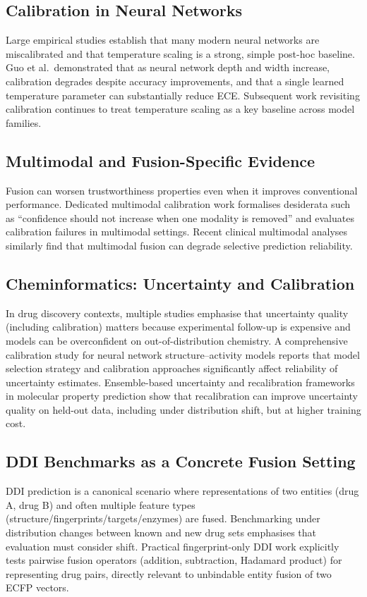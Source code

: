 \documentclass[11pt,a4paper,twocolumn]{article}
\begin{document}
\subsection{Calibration in Neural Networks}
Large empirical studies establish that many modern neural networks are
miscalibrated and that temperature scaling is a strong, simple post-hoc
baseline.
Guo et al.\ demonstrated that as neural network depth and width increase,
calibration degrades despite accuracy improvements, and that a single
learned temperature parameter can substantially reduce ECE.
Subsequent work revisiting calibration continues to treat temperature
scaling as a key baseline across model families.

\subsection{Multimodal and Fusion-Specific Evidence}
Fusion can worsen trustworthiness properties even when it improves
conventional performance.
Dedicated multimodal calibration work formalises desiderata such as
``confidence should not increase when one modality is removed'' and
evaluates calibration failures in multimodal settings.
Recent clinical multimodal analyses similarly find that multimodal fusion
can degrade selective prediction reliability.

\subsection{Cheminformatics: Uncertainty and Calibration}
In drug discovery contexts, multiple studies emphasise that uncertainty
quality (including calibration) matters because experimental follow-up is
expensive and models can be overconfident on out-of-distribution chemistry.
A comprehensive calibration study for neural network structure--activity
models reports that model selection strategy and calibration approaches
significantly affect reliability of uncertainty estimates.
Ensemble-based uncertainty and recalibration frameworks in molecular
property prediction show that recalibration can improve uncertainty quality
on held-out data, including under distribution shift, but at higher
training cost.

\subsection{DDI Benchmarks as a Concrete Fusion Setting}
DDI prediction is a canonical scenario where representations of two
entities (drug A, drug B) and often multiple feature types
(structure/fingerprints/targets/enzymes) are fused.
Benchmarking under distribution changes between known and new drug sets
emphasises that evaluation must consider shift.
Practical fingerprint-only DDI work explicitly tests pairwise fusion
operators (addition, subtraction, Hadamard product) for representing drug
pairs, directly relevant to unbindable entity fusion of two ECFP vectors.
\end{document}
